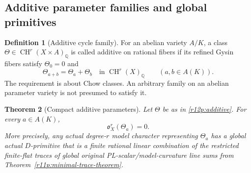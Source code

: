 \documentclass[11pt]{article}
\newtheorem{theorem}{Theorem}[section]
\theoremstyle{definition}
\newtheorem{definition}[theorem]{Definition}
\theoremstyle{remark}
\numberwithin{equation}{section}
\begin{document}
\subsection{Additive parameter families and global primitives}

\begin{definition}[Additive cycle family]
For an abelian variety $A/K$, a class
$\Theta\in\operatorname{CH}^r(X\times A)_{\mathbb Q}$ is called
additive on rational fibers if its refined Gysin fibers satisfy
$\Theta_0=0$ and
\[
       \Theta_{a+b}=\Theta_a+\Theta_b
       \quad\text{in }\operatorname{CH}^r(X)_{\mathbb Q}
       \qquad(a,b\in A(K)).
\tag{R12.P3}\label{r12p:additive}
\]
The requirement is about Chow classes.  An arbitrary family on an
abelian parameter variety is not presumed to satisfy it.
\end{definition}

\begin{theorem}[Compact additive parameters]
\label{r12p:compact-additive}
Let $\Theta$ be as in \eqref{r12p:additive}.  For every $a\in A(K)$,
\[
                          \mathfrak o_X^r(\Theta_a)=0.
\tag{R12.P4}\label{r12p:additive-zero}
\]
More precisely, any actual degree-$r$ model character representing
$\Theta_a$ has a global actual $D$-primitive that is a finite rational
linear combination of the restricted finite-flat traces of global
original PL-scalar/model-curvature line sums from Theorem~\ref{r11p:minimal-trace-theorem}.
\end{theorem}
\end{document}
